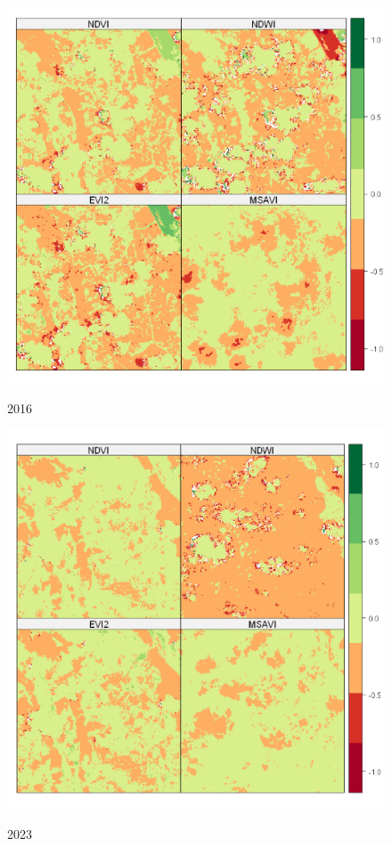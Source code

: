  			\begin{minipage}[t!]{0.31\textwidth}
 				
 				\begin{figure}[H]
 					\centering \small \caption{2016}
 					\includegraphics[width=0.97\linewidth]{FIGURAS/indices20160101}
 					\label{fig:inda15} 
 				\end{figure}			
 				
 			\end{minipage} 
 			\begin{minipage}[t!]{0.31\textwidth}
 				
 				\begin{figure}[H]
 					\centering \small \caption{2023}
 					\includegraphics[width=0.97\linewidth]{FIGURAS/indices20231222}
 					\label{fig:inda2023} 
 				\end{figure}		
 			\end{minipage} 
 			
